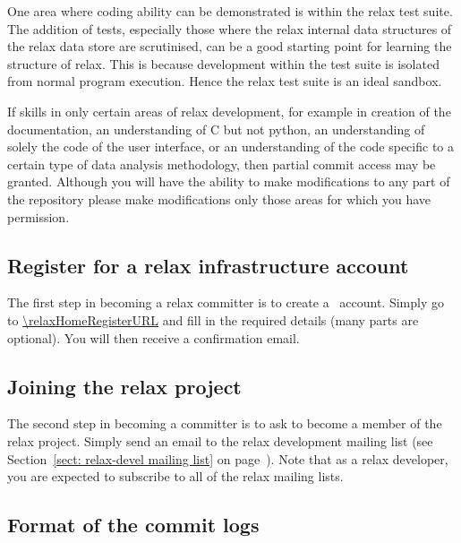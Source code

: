 One area where coding ability can be demonstrated is within the relax test suite.
The addition of tests, especially those where the relax internal data structures of the relax data store are scrutinised, can be a good starting point for learning the structure of relax.
This is because development within the test suite is isolated from normal program execution.
Hence the relax test suite is an ideal sandbox.

If skills in only certain areas of relax development, for example in creation of the documentation, an understanding of C but not python, an understanding of solely the code of the user interface, or an understanding of the code specific to a certain type of data analysis methodology, then partial commit access may be granted.
Although you will have the ability to make modifications to any part of the repository please make modifications only those areas for which you have permission.



\subsection{Register for a relax infrastructure account}

The first step in becoming a relax committer is to create a \relaxHome\ account\index{\relaxHome}.
Simply go to \url{\relaxHomeRegisterURL} and fill in the required details (many parts are optional).
You will then receive a confirmation email.



\subsection{Joining the relax project}

The second step in becoming a committer is to ask to become a member of the relax project.
Simply send an email to the relax development mailing list (see Section~\ref{sect: relax-devel mailing list} on page~\pageref{sect: relax-devel mailing list}).
Note that as a relax developer, you are expected to subscribe to all of the relax mailing lists.


\subsection{Format of the commit logs}\label{commit log format}


